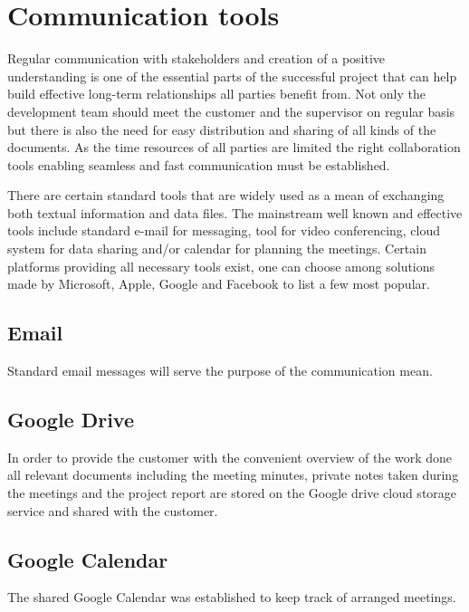 \section{Communication tools} \label{sec:communication_tools}
Regular communication with stakeholders and creation of a positive understanding is one of the essential parts of the successful project that can help build effective long-term relationships all parties benefit from. 
Not only the development team should meet the customer and the supervisor on regular basis but there is also the need for easy distribution and sharing of all kinds of the documents. 
As the time resources of all parties are limited the right collaboration tools enabling seamless and fast communication must be established.

There are certain standard tools that are widely used as a mean of exchanging both textual information and data files. 
The mainstream well known and effective tools include standard e-mail for messaging, tool for video conferencing, cloud system for data sharing and/or calendar for planning the meetings. 
Certain platforms providing all necessary tools exist, one can choose among solutions made by Microsoft, Apple, Google and Facebook to list a few most popular.


\subsection{Email}
Standard email messages will serve the purpose of the communication mean.


\subsection{Google Drive}
In order to provide the customer with the convenient overview of the work done all relevant documents including the meeting minutes, private notes taken during the meetings and the project report are stored on the Google drive cloud storage service and shared with the customer.


\subsection{Google Calendar}
The shared Google Calendar was established to keep track of arranged meetings.


